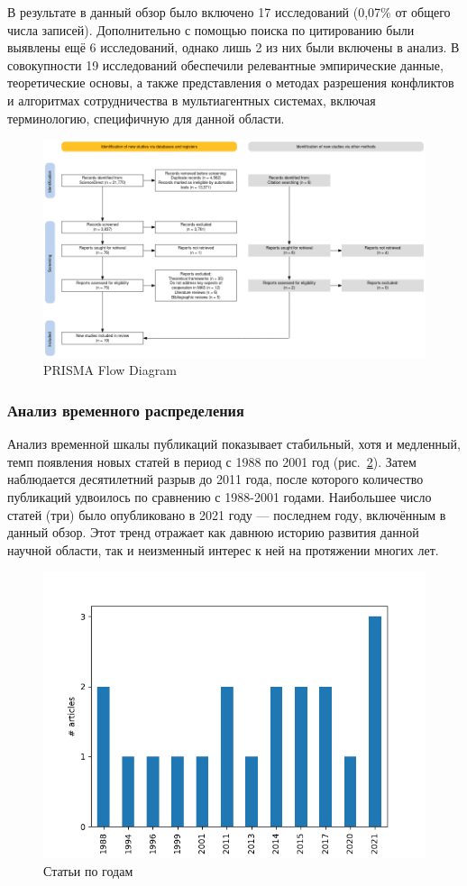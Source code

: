 \documentclass[%
]{ittmm}
\begin{document}
В результате в данный обзор было включено 17 исследований (0,07\% от общего числа записей).
Дополнительно с помощью поиска по цитированию были выявлены ещё 6 исследований, однако лишь 2 из них были включены в анализ.
В совокупности 19 исследований обеспечили релевантные эмпирические данные, теоретические основы,
а также представления о методах разрешения конфликтов и алгоритмах сотрудничества в мультиагентных системах,
включая терминологию, специфичную для данной области.

\begin{figure}
  \centering
  \includegraphics[width=0.8\linewidth]{PRISMA.png}
  \caption{PRISMA Flow Diagram}
  \label{fig:PRISMA}
\end{figure}

\subsubsection{Анализ временного распределения}

Анализ временной шкалы публикаций показывает стабильный, хотя и медленный,
темп появления новых статей в период с 1988 по 2001 год (рис.~\ref{fig:articles-by-year}).
Затем наблюдается десятилетний разрыв до 2011 года,
после которого количество публикаций удвоилось по сравнению с 1988-2001 годами.
Наибольшее число статей (три) было опубликовано в 2021 году
--- последнем году, включённым в данный обзор.
Этот тренд отражает как давнюю историю развития данной научной области,
так и неизменный интерес к ней на протяжении многих лет.

\begin{figure}
  \centering
  \includegraphics[width=0.8\linewidth]{articles_by_years.png}
  \caption{Статьи по годам}
  \label{fig:articles-by-year}
\end{figure}
\end{document}
